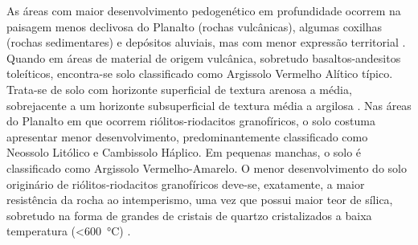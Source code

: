 
As áreas com maior desenvolvimento pedogenético em profundidade ocorrem na paisagem menos declivosa do Planalto 
(rochas vulcânicas), algumas coxilhas (rochas sedimentares) e depósitos aluviais, mas com menor expressão 
territorial \cite{Miguel2010}. Quando em áreas de material de origem vulcânica, sobretudo basaltos-andesitos 
toleíticos, encontra-se solo classificado como Argissolo Vermelho Alítico típico. Trata-se de solo com 
horizonte superficial de textura arenosa a média, sobrejacente a um horizonte subsuperficial de textura média a 
argilosa \cite{Miguel2010}. Nas áreas do Planalto em que ocorrem riólitos-riodacitos granofíricos, o solo 
costuma apresentar menor desenvolvimento, predominantemente classificado como Neossolo Litólico e Cambissolo 
Háplico. Em pequenas manchas, o solo é classificado como Argissolo Vermelho-Amarelo. O menor desenvolvimento do 
solo originário de riólitos-riodacitos granofíricos deve-se, exatamente, a maior resistência da rocha ao 
intemperismo, uma vez que possui maior teor de sílica, sobretudo na forma de grandes de cristais de quartzo 
cristalizados a baixa temperatura (\SI{<600}{\celsius}) \cite{Pedron2007}.


